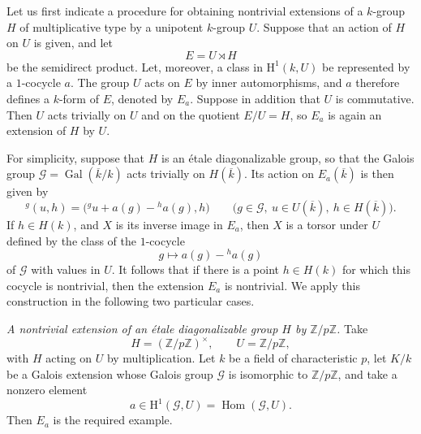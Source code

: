 
Let us first indicate a procedure for obtaining nontrivial
extensions of a \(k\)-group \(H\) of multiplicative type by a
unipotent \(k\)-group \(U\).  Suppose that an action of \(H\) on
\(U\) is given, and let
\[
  E=U\rtimes H
\]
be the semidirect product.  Let, moreover, a class in
\(\mathrm H^1(k,U)\) be represented by a \(1\)-cocycle \(a\).
The group \(U\) acts on \(E\) by inner automorphisms, and \(a\)
therefore defines a \(k\)-form of \(E\), denoted by \(E_a\).
Suppose in addition that \(U\) is commutative.  Then \(U\) acts
trivially on \(U\) and on the quotient \(E/U=H\), so \(E_a\) is
again an extension of \(H\) by \(U\).

For simplicity, suppose that \(H\) is an étale diagonalizable
group, so that the Galois group
\(\mathscr G=\operatorname{Gal}(\overline{k}/k)\) acts trivially
on \(H(\overline{k})\).  Its action on \(E_a(\overline{k})\) is
then given by
\[
  {}^g(u,h)
  =\bigl({}^g u+a(g)-{}^h a(g),h\bigr)
  \qquad
  \bigl(g\in\mathscr G,\ u\in U(\overline{k}),\
        h\in H(\overline{k})\bigr).
\]
If \(h\in H(k)\), and \(X\) is its inverse image in \(E_a\), then
\(X\) is a torsor under \(U\) defined by the class of the
\(1\)-cocycle
\[
  g\longmapsto a(g)-{}^h a(g)
\]
of \(\mathscr G\) with values in \(U\).  It follows that if there
is a point \(h\in H(k)\) for which this cocycle is nontrivial,
then the extension \(E_a\) is nontrivial.  We apply this
construction in the following two particular cases.

\smallskip
\noindent
\emph{ A nontrivial extension of an étale diagonalizable group
\(H\) by \(\mathbb Z/p\mathbb Z\).}
Take
\[
  H=(\mathbb Z/p\mathbb Z)^\times,
  \qquad U=\mathbb Z/p\mathbb Z,
\]
with \(H\) acting on \(U\) by multiplication.  Let \(k\) be a
field of characteristic \(p\), let \(K/k\) be a Galois extension
whose Galois group \(\mathscr G\) is isomorphic to
\(\mathbb Z/p\mathbb Z\), and take a nonzero element
\[
  a\in\mathrm H^1(\mathscr G,U)
   =\operatorname{Hom}(\mathscr G,U).
\]
Then \(E_a\) is the required example.

